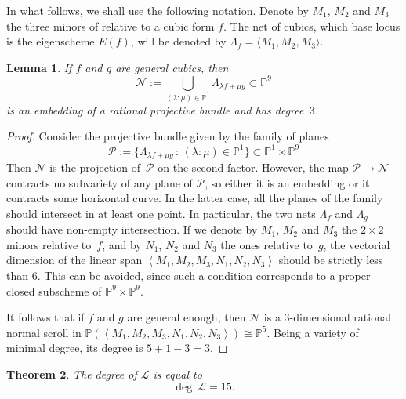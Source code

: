 \documentclass[12pt, a4paper, reqno, captions=tableheading,bibliography=totoc]{scrartcl}
\theoremstyle{plain}
\newtheorem{lemma}{Lemma}[section]
\newtheorem{theorem}[lemma]{Theorem}
\theoremstyle{definition}
\newcommand{\p}{\mathbb{P}}
\begin{document}
In what follows, we shall use the following notation.
Denote by $M_1$, $M_2$ and $M_3$ the three minors of  relative to a cubic form $f$.
The net of cubics, which base locus is the eigenscheme $E(f)$, will be denoted by $\Lambda_f = \langle M_1, M_2, M_3 \rangle$.
\begin{lemma}
\label{lemma:scroll}
 If $f$ and $g$ are general cubics, then
 \[
   \mathcal{N} := \bigcup_{(\lambda : \mu) \in \p^1} \Lambda_{\lambda f + \mu g} \subset \p^9
 \]
 is an embedding of a rational projective bundle and has degree~$3$.
\end{lemma}
\begin{proof}
Consider the projective bundle given by the family of planes
%
\[
{\mathcal P} := \{ \Lambda_{\lambda f + \mu g} \, : \, (\lambda: \mu)\in \p^1 \} \subset \p^1 \times \p^9
\]
%
Then $\mathcal{N}$ is the projection of~$\mathcal{P}$ on the second factor.
However, the map ${\mathcal P} \to {\mathcal N}$ contracts no subvariety of any plane of ${\mathcal P}$, so either it is an embedding or it contracts some horizontal curve. In the latter case, all the planes of the family should intersect in at least one point. In particular, the two nets $\Lambda_f$ and $\Lambda_g$ should have non-empty intersection.
If we denote by $M_1$, $M_2$ and $M_3$ the $2 \times 2$ minors relative to~$f$, and by $N_1$, $N_2$ and $N_3$ the ones relative to~$g$, the vectorial dimension of the linear span $\left\langle M_1, M_2, M_3, N_1, N_2, N_3 \right\rangle$ should be strictly less than $6$. This can be avoided, since such a condition corresponds to a proper closed subscheme of $\p^9 \times \p^9$.

It follows that if $f$ and $g$ are general enough, then $\mathcal{N}$ is a $3$-dimensional rational normal scroll in $\p(\left\langle M_1, M_2, M_3, N_1, N_2, N_3 \right\rangle) \cong \p^5$.
Being a variety of minimal degree, its degree is $5+1-3 = 3$.
\end{proof}

\begin{theorem}
The degree of $\mathcal L$ is equal to
\[
  \deg \ \mathcal L =  15.
\]
\end{theorem}
\end{document}
